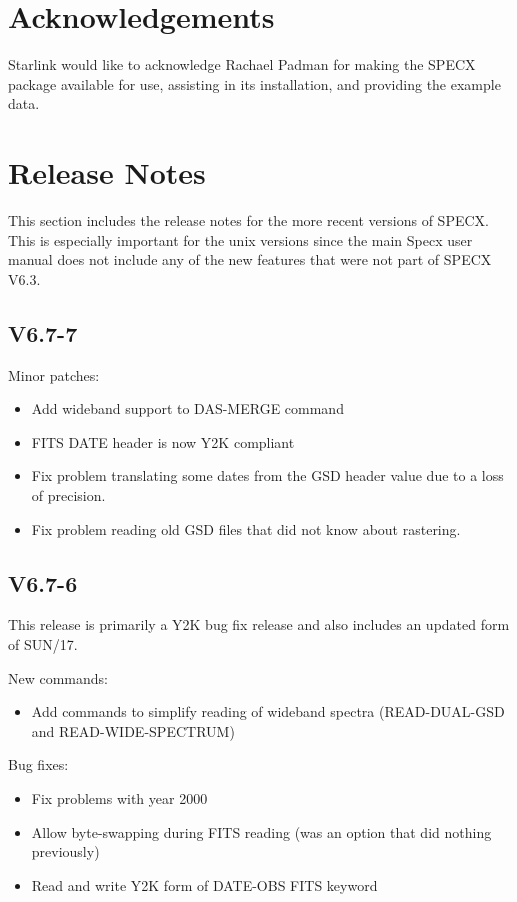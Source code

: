 \documentclass[twoside,11pt]{article}
\renewcommand{\_}{\texttt{\symbol{95}}}
\begin{document}
\section{Acknowledgements}

Starlink would like to acknowledge Rachael Padman for making
the SPECX package available for use, assisting in its installation,
and providing the example data.

\appendix

\section{Release Notes}

This section includes the release notes for the more recent versions
of SPECX. This is especially important for the unix versions since
the main Specx user manual does not include any of the new features
that were not part of SPECX V6.3.

\subsection{V6.7-7}

Minor patches:

\begin{itemize}
\item Add wideband support to DAS-MERGE command
\item FITS DATE header is now Y2K compliant
\item Fix problem translating some dates from the GSD header value due to a loss of  precision.
\item Fix problem reading old GSD files that did not know about rastering.
\end{itemize}

\subsection{V6.7-6}

This release is primarily a Y2K bug fix release and also includes an
updated form of SUN/17.

\begin{description}

\item New commands:
\begin{itemize}
\item Add commands to simplify reading of wideband spectra (READ-DUAL-GSD and
READ-WIDE-SPECTRUM)
\end{itemize}
\item Bug fixes:
\begin{itemize}
\item Fix problems with year 2000
\item Allow byte-swapping during FITS reading (was an option that
    did nothing previously)
\item Read and write Y2K form of DATE-OBS FITS keyword
\end{itemize}
\end{description}
\end{document}
